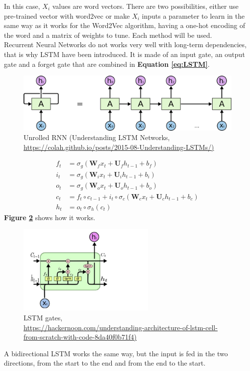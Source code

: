 In this case, $X_i$ values are word vectors. There are two possibilities, either use pre-trained vector with word2vec or make $X_i$ inputs a parameter to learn in the same way as it works for the Word2Vec algorithm, having a one-hot encoding of the word and a matrix of weights to tune. Each method will be used. \\

Recurrent Neural Networks do not works very well with long-term dependencies, that is why LSTM have been introduced. It is made of an input gate, an output gate and a forget gate that are combined in \textbf{Equation \ref{eq:LSTM}}.
\begin{figure}
 \centering
 \includegraphics[width=\textwidth]{images/chapitre4/RNN-unrolled.png}
 \caption{Unrolled RNN (Understanding LSTM Networks, \url{https://colah.github.io/posts/2015-08-Understanding-LSTMs/)}}
 \label{fig:chap4:RNN_unroll}
\end{figure} 
\begin{align} \label{eq:LSTM}
 f_t &= \sigma_g(\mathbf{W}_f x_t + \mathbf{U}_fh_{t-1} + b_f)\\
 i_t &= \sigma_g(\mathbf{W}_i x_t + \mathbf{U}_ih_{t-1} + b_i)\\
 o_t &= \sigma_g(\mathbf{W}_o x_t + \mathbf{U}_oh_{t-1} + b_o)\\
 c_t &= f_t \circ c_{t-1} + i_t \circ \sigma_c(\mathbf{W}_cx_t + \mathbf{U}_c h_{t-1} + b_c)\\
 h_t &= o_t \circ \sigma_h (c_t)
\end{align}
\textbf{Figure \ref{fig:chap4:LSTM-gates}} shows how it works.
\begin{figure}
 \centering
 \includegraphics[width=0.6\textwidth]{images/chapitre4/LSTM1.jpeg}
 \caption{LSTM gates, \\ \url{https://hackernoon.com/understanding-architecture-of-lstm-cell-from-scratch-with-code-8da40f0b71f4)}}
 \label{fig:chap4:LSTM-gates}
\end{figure} 
A bidirectional LSTM works the same way, but the input is fed in the two directions, from the start to the end and from the end to the start.
